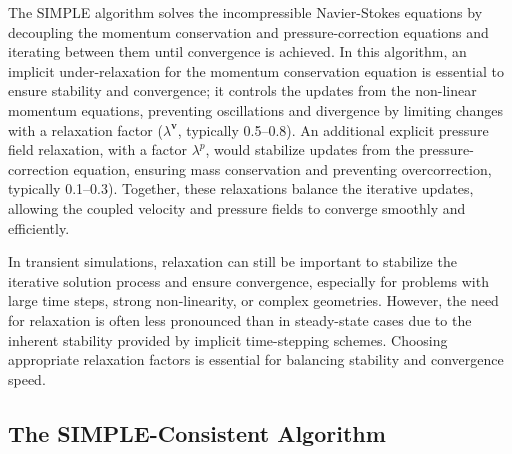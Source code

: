\documentclass[12pt]{extarticle}
\newcommand{\<}{\langle}
\renewcommand{\>}{\rangle}
\theoremstyle{definition}
\begin{document}
The SIMPLE algorithm solves the incompressible Navier-Stokes equations by decoupling the momentum conservation and pressure-correction equations and iterating between them until convergence is achieved. In this algorithm, an implicit under-relaxation for the momentum conservation equation is essential to ensure stability and convergence; it controls the updates from the non-linear momentum equations, preventing oscillations and divergence by limiting changes with a relaxation factor (\(\lambda^\textbf{v}\), typically 0.5–0.8). An additional explicit pressure field relaxation, with a factor \(\lambda^p\), would stabilize updates from the pressure-correction equation, ensuring mass conservation and preventing overcorrection, typically 0.1–0.3). Together, these relaxations balance the iterative updates, allowing the coupled velocity and pressure fields to converge smoothly and efficiently.

In transient simulations, relaxation can still be important to stabilize the iterative solution process and ensure convergence, especially for problems with large time steps, strong non-linearity, or complex geometries. However, the need for relaxation is often less pronounced than in steady-state cases due to the inherent stability provided by implicit time-stepping schemes. Choosing appropriate relaxation factors is essential for balancing stability and convergence speed.

\subsection{The SIMPLE-Consistent Algorithm}
\end{document}

